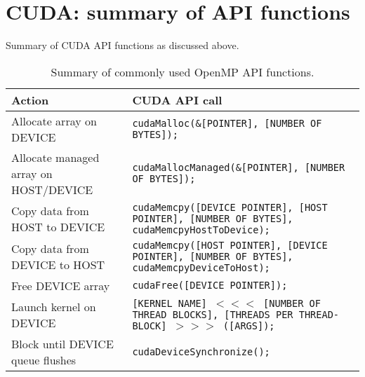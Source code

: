 \section{CUDA: summary of API functions}

Summary of CUDA API functions as discussed above.
\begin{table}[htbp!]
    \centering
    \begin{tabular}{p{2in}|p{4in}} \hline
      Action & CUDA API call\\ \hline
      Allocate array on DEVICE & \texttt{cudaMalloc(\&[POINTER], [NUMBER OF BYTES]);} \\
      Allocate managed array on HOST/DEVICE &  \texttt{cudaMallocManaged(\&[POINTER], [NUMBER OF BYTES]);} \\ \hline
      Copy data from HOST to DEVICE & \texttt{cudaMemcpy([DEVICE POINTER], [HOST POINTER], [NUMBER OF BYTES], cudaMemcpyHostToDevice);} \\
      Copy data from DEVICE to HOST & \texttt{cudaMemcpy([HOST POINTER], [DEVICE POINTER], [NUMBER OF BYTES], cudaMemcpyDeviceToHost);} \\ 
      Free DEVICE array & \texttt{cudaFree([DEVICE POINTER]);} \\ \hline
      Launch kernel on DEVICE & \texttt{[KERNEL NAME] $<<<$ [NUMBER OF THREAD BLOCKS], [THREADS PER THREAD-BLOCK] $>>>$ ([ARGS]);} \\
      Block until DEVICE queue flushes & \texttt{cudaDeviceSynchronize();} \\
    \hline\end{tabular}
    \caption{Summary of commonly used OpenMP API functions.}
    \label{ompDirectives.tab}
\end{table}

\printbibliography[heading=subbibliography]